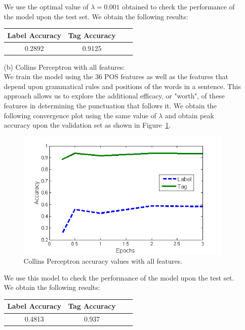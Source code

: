 \documentclass[11pt,a4paper,oneside]{article}
\begin{document}
\begin{itemize}
We use the optimal value of $\lambda = 0.001$ obtained to check the performance of the model upon the test set. We obtain the following results:

\begin{center}
\begin{tabular}{|c|c|c|c|}
\hline
Label Accuracy & Tag Accuracy\\\hline
0.2892	& 0.9125\\\hline
\end{tabular}
\end{center}

\item[(b)] Collins Perceptron with all features:\\

We train the model using the 36 POS features as well as the features that depend upon grammatical rules and positions of the words in a sentence. This approach allows us to explore the additional efficacy, or "worth", of these features in determining the punctuation that follows it. We obtain the following convergence plot using the same value of $\lambda$ and obtain peak accuracy upon the validation set as shown in Figure~\ref{fig:CP_newFF}.

\begin{figure}[H]
\centering
\includegraphics[width=\columnwidth]{CP_newFF}
\caption{Collins Perceptron accuracy values with all features.}
\label{fig:CP_newFF}
\end{figure}

We use this model to check the performance of the model upon the test set. We obtain the following results:

\begin{center}
\begin{tabular}{|c|c|c|c|}
\hline
Label Accuracy & Tag Accuracy\\\hline
0.4813	& 0.937\\\hline
\end{tabular}
\end{center}


\end{itemize}
\end{document}
